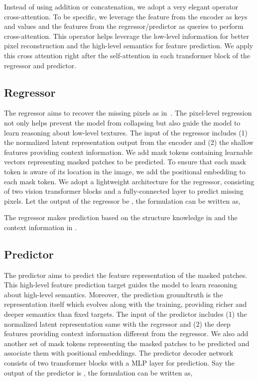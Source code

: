 \documentclass[runningheads]{llncs}
\begin{document}
Instead of using addition or concatenation, we adopt a very elegant operator cross-attention.
To be specific, we leverage the feature from the encoder as keys and values and the features from the regressor/predictor as queries to perform cross-attention. This operator helps leverage the low-level information for better pixel reconstruction and the high-level semantics for feature prediction. We apply this cross attention right after the self-attention in each transformer block of the regressor and predictor.

\vspace{-1mm}
\subsection{Regressor}
\vspace{-1mm}
The regressor aims to recover the missing pixels as in~\cite{he2021masked}.
The pixel-level regression not only helps prevent the model from collapsing but also guide the model to learn reasoning about low-level textures.
The input of the regressor includes (1) the normalized latent representation output from the encoder and (2) the shallow features providing context information.
We add mask tokens  containing  learnable vectors representing masked patches to be predicted. To ensure that each mask token is aware of its location in the image, we add the positional embedding to each mask token. We adopt a lightweight architecture for the regressor, consisting of two vision transformer blocks and 
a fully-connected layer to predict missing pixels. Let the output of the regressor be , the formulation can be written as,

The regressor makes prediction based on the structure knowledge in  and the context information in .

\vspace{-1mm}
\subsection{Predictor}
\vspace{-1mm}
The predictor aims to predict the feature representation of the masked patches.
This high-level feature prediction target guides the model to learn reasoning about high-level semantics. Moreover, the prediction groundtruth is the representation itself which evolves along with the training, providing richer and deeper semantics than fixed targets.
The input of the predictor includes (1) the normalized latent representation same with the regressor and (2) the deep features providing context information different from the regressor.
We also add another set of mask tokens  representing the masked patches to be predicted and associate them with positional embeddings.
The predictor decoder network consists of two transformer blocks with a MLP layer for prediction. 
Say the output of the predictor is , the formulation can be written as,
\end{document}
